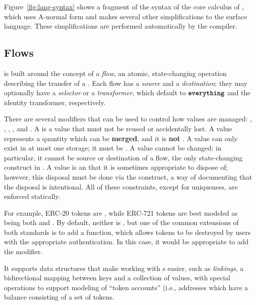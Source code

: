 \documentclass[dvipsnames, usenames, sigconf]{acmart}
\begin{document}
Figure~\ref{fig:lang-syntax} shows a fragment of the syntax of the core calculus of \langName, which uses A-normal form and makes several other simplifications to the surface \langName language.
These simplifications are performed automatically by the compiler.

\subsection{Flows}
\langName is built around the concept of a \emph{flow}, an atomic, state-changing operation describing the transfer of a \assetTxt.
Each flow has a \emph{source} and a \emph{destination}; they may optionally have a \emph{selector} or a \emph{transformer}, which default to $\textbf{\texttt{everything}}$ and the identity transformer, respectively.

There are several modifiers that can be used to control how values are managed: , , , , and .
A  is a value that must not be reused or accidentally lost.
A  value represents a quantity which can be \textbf{merged}, and it is \textbf{not} .
A  value can only exist in at most one storage; it must be .
A  value cannot be changed; in particular, it cannot be source or destination of a flow, the only state-changing construct in \langName {}.
A  value is an  that it is sometimes appropriate to dispose of; however, this disposal must be done via the  construct, a way of documenting that the disposal is intentional.
All of these constraints, except for uniqueness, are enforced statically.

For example, ERC-20 tokens are , while ERC-721 tokens are best modeled as being both  and .
By default, neither is , but one of the common extensions of both standards is to add a  function, which allows tokens to be destroyed by users with the appropriate authentication.
In this case, it would be appropriate to add the  modifier.

It supports data structures that make working with \assetTxt{}s easier, such as \emph{linkings}, a bidirectional mapping between keys and a collection of values, with special operations to support modeling of ``token accounts'' (i.e., addresses which have a balance consisting of a set of tokens.
\end{document}
